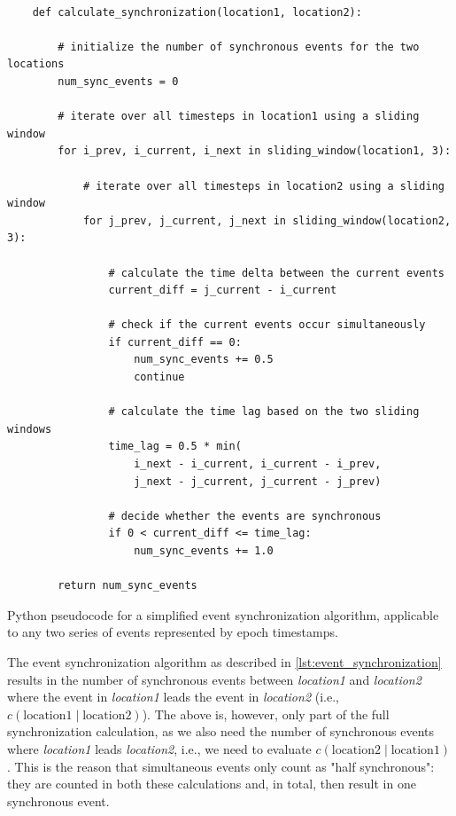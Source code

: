 \begin{listing}[h]
  \begin{verbatim}

    def calculate_synchronization(location1, location2):

        # initialize the number of synchronous events for the two locations
        num_sync_events = 0

        # iterate over all timesteps in location1 using a sliding window
        for i_prev, i_current, i_next in sliding_window(location1, 3):

            # iterate over all timesteps in location2 using a sliding window
            for j_prev, j_current, j_next in sliding_window(location2, 3):

                # calculate the time delta between the current events
                current_diff = j_current - i_current

                # check if the current events occur simultaneously
                if current_diff == 0:
                    num_sync_events += 0.5
                    continue

                # calculate the time lag based on the two sliding windows
                time_lag = 0.5 * min(
                    i_next - i_current, i_current - i_prev,
                    j_next - j_current, j_current - j_prev)

                # decide whether the events are synchronous
                if 0 < current_diff <= time_lag:
                    num_sync_events += 1.0

        return num_sync_events

  \end{verbatim}
  \caption{Python pseudocode for a simplified event synchronization algorithm, applicable to any two series of events represented by epoch timestamps.}
  \label{lst:event_synchronization}
\end{listing}

The event synchronization algorithm as described in \cref{lst:event_synchronization} results in the number of synchronous events between \textit{location1} and \textit{location2} where the event in \textit{location1} leads the event in \textit{location2} (i.e., $c(\text{location1} \mid \text{location2})$). The above is, however, only part of the full synchronization calculation, as we also need the number of synchronous events where \textit{location1} leads \textit{location2}, i.e., we need to evaluate $c(\text{location2} \mid \text{location1})$. This is the reason that simultaneous events only count as "half synchronous": they are counted in both these calculations and, in total, then result in one synchronous event.

